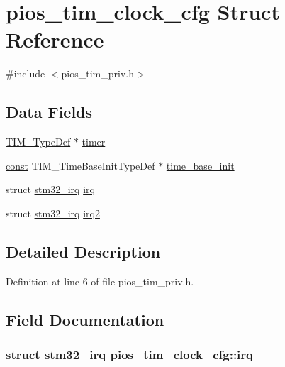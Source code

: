 \hypertarget{structpios__tim__clock__cfg}{\section{pios\-\_\-tim\-\_\-clock\-\_\-cfg Struct Reference}
\label{structpios__tim__clock__cfg}
}


{\ttfamily \#include $<$pios\-\_\-tim\-\_\-priv.\-h$>$}

\subsection*{Data Fields}
\begin{DoxyCompactItemize}
\item 
\hyperlink{struct_t_i_m___type_def}{T\-I\-M\-\_\-\-Type\-Def} $\ast$ \hyperlink{structpios__tim__clock__cfg_a537f6f4946bc2f5e188a9c3fec55647e}{timer}
\item 
\hyperlink{group___n_a_m_e_ga7ae6d0e43244213b34de2c2b9aa30da6}{const} T\-I\-M\-\_\-\-Time\-Base\-Init\-Type\-Def $\ast$ \hyperlink{structpios__tim__clock__cfg_abdc708ba1a22f20e3f31502ca32b2c13}{time\-\_\-base\-\_\-init}
\item 
struct \hyperlink{structstm32__irq}{stm32\-\_\-irq} \hyperlink{structpios__tim__clock__cfg_a18666698f574b98c40132fe328ba981c}{irq}
\item 
struct \hyperlink{structstm32__irq}{stm32\-\_\-irq} \hyperlink{structpios__tim__clock__cfg_acb3841e388653b5ab1b67bfcc2418b33}{irq2}
\end{DoxyCompactItemize}


\subsection{Detailed Description}


Definition at line 6 of file pios\-\_\-tim\-\_\-priv.\-h.



\subsection{Field Documentation}
\hypertarget{structpios__tim__clock__cfg_a18666698f574b98c40132fe328ba981c}{
\subsubsection[{irq}]{\setlength{\rightskip}{0pt plus 5cm}struct {\bf stm32\-\_\-irq} pios\-\_\-tim\-\_\-clock\-\_\-cfg\-::irq}}\label{structpios__tim__clock__cfg_a18666698f574b98c40132fe328ba981c}


